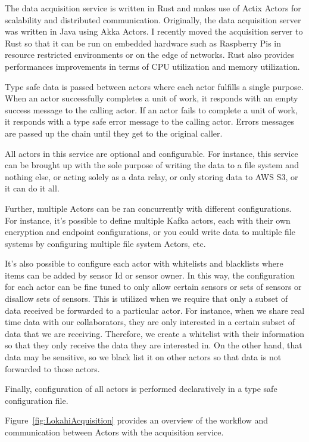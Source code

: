 The data acquisition service is written in Rust and makes use of Actix Actors for scalability and distributed communication. Originally, the data acquisition server was written in Java using Akka Actors. I recently moved the acquisition server to Rust so that it can be run on embedded hardware such as Raspberry Pis in resource restricted environments or on the edge of networks. Rust also provides performances improvements in terms of CPU utilization and memory utilization.

Type safe data is passed between actors where each actor fulfills a single purpose. When an actor successfully completes a unit of work, it responds with an empty success message to the calling actor. If an actor fails to complete a unit of work, it responds with a type safe error message to the calling actor. Errors messages are passed up the chain until they get to the original caller.

All actors in this service are optional and configurable. For instance, this service can be brought up with the sole purpose of writing the data to a file system and nothing else, or acting  solely as a data relay, or only storing data to AWS S3, or it can do it all.

Further, multiple Actors can be ran concurrently with different configurations. For instance, it's possible to define multiple Kafka actors, each with their own encryption and endpoint configurations, or you could write data to multiple file systems by configuring multiple file system Actors, etc.

It's also possible to configure each actor with whitelists and blacklists where items can be added by sensor Id or sensor owner. In this way, the configuration for each actor can be fine tuned to only allow certain sensors or sets of sensors or disallow sets of sensors. This is utilized when we require that only a subset of data received be forwarded to a particular actor. For instance, when we share real time data with our collaborators, they are only interested in a certain subset of data that we are receiving. Therefore, we create a whitelist with their information so that they only receive the data they are interested in. On the other hand, that data may be sensitive, so we black list it on other actors so that data is not forwarded to those actors.

Finally, configuration of all actors is performed declaratively in a type safe configuration file.

Figure~\ref{fig:LokahiAcquisition} provides an overview of the workflow and communication between Actors with the acquisition service.

